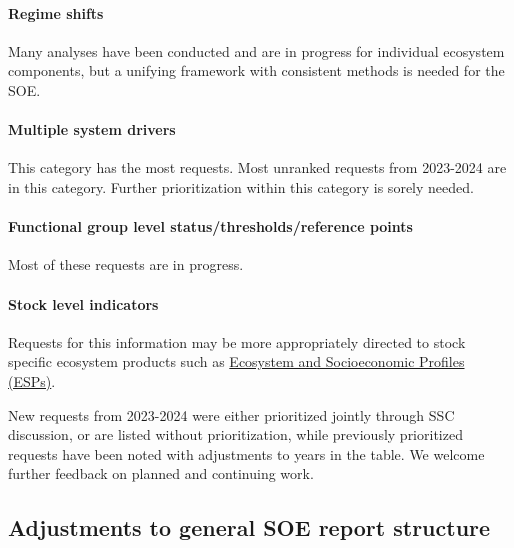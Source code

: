 \documentclass[
  10pt,
]{article}
\begin{document}
\hypertarget{regime-shifts}{%
\paragraph{Regime shifts}\label{regime-shifts}}

Many analyses have been conducted and are in progress for individual
ecosystem components, but a unifying framework with consistent methods
is needed for the SOE.

\hypertarget{multiple-system-drivers}{%
\paragraph{Multiple system drivers}\label{multiple-system-drivers}}

This category has the most requests. Most unranked requests from
2023-2024 are in this category. Further prioritization within this
category is sorely needed.

\hypertarget{functional-group-level-statusthresholdsreference-points}{%
\paragraph{Functional group level status/thresholds/reference
points}\label{functional-group-level-statusthresholdsreference-points}}

Most of these requests are in progress.

\hypertarget{stock-level-indicators}{%
\paragraph{Stock level indicators}\label{stock-level-indicators}}

Requests for this information may be more appropriately directed to
stock specific ecosystem products such as
\href{https://www.fisheries.noaa.gov/new-england-mid-atlantic/science-data/ecosystem-and-socioeconomic-profiles-northeast-united-states}{Ecosystem
and Socioeconomic Profiles (ESPs)}.

New requests from 2023-2024 were either prioritized jointly through SSC
discussion, or are listed without prioritization, while previously
prioritized requests have been noted with adjustments to years in the
table. We welcome further feedback on planned and continuing work.

\hypertarget{adjustments-to-general-soe-report-structure}{%
\subsection{Adjustments to general SOE report
structure}\label{adjustments-to-general-soe-report-structure}}
\end{document}
